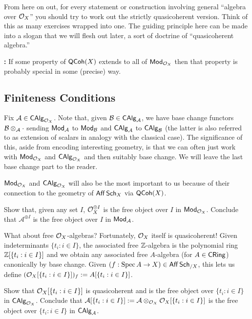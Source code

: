 \documentclass[11pt]{article}
\renewcommand{\AA}{\mathcal{A}}
\newcommand{\BB}{\mathcal{B}}
\begin{document}
From here on out, for every statement or construction involving general ``algebra over $\mathcal{O}_X$'' you should try to work out the strictly quasicoherent version. Think of this as many exercises wrapped into one. The guiding principle here can be made into a slogan that we will flesh out later, a sort of doctrine of ``quasicoherent algebra.''

\textbf{:} If some property of $\operatorname{\mathsf{QCoh}}(X)$ extends to all of $\operatorname{\mathsf{Mod}}_{\mathcal{O}_X}$ then that property is probably special in some (precise) way.

\subsection{Finiteness Conditions}
Fix $\AA\in\CAlg_{\O_X}$. Note that, given $\BB\in\CAlg_{\AA}$, we have base change functors $\BB\tensor_{\AA}\cdot$ sending $\Mod_{\AA}$ to $\Mod_{\BB}$ and $\CAlg_{\AA}$ to $\CAlg_{\BB}$ (the latter is also referred to as extension of scalars in analogy with the classical case). The significance of this, aside from encoding interesting geometry, is that we can often just work with $\operatorname{\mathsf{Mod}}_{\mathcal{O}_X}$ and $\operatorname{\mathsf{CAlg}}_{\mathcal{O}_X}$ and then suitably base change. We will leave the last base change part to the reader.

\begin{remark}
$\operatorname{\mathsf{Mod}}_{\mathcal{O}_X}$ and $\operatorname{\mathsf{CAlg}}_{\mathcal{O}_X}$ will also be the most important to us because of their connection to the geometry of $\operatorname{\mathsf{Aff}}\operatorname{\mathsf{Sch}}_X$ via $\operatorname{\mathsf{QCoh}}(X)$.
\end{remark}

\begin{exercise}
Show that, given any set $I$, $\mathcal{O}_X^{\oplus I}$ is the free object over $I$ in $\operatorname{\mathsf{Mod}}_{\mathcal{O}_X}$. Conclude that $\AA^{\oplus I}$ is the free object over $I$ in $\Mod_{\AA}$.
\end{exercise}

What about free $\mathcal{O}_X$-algebras? Fortunately, $\mathcal{O}_X$ itself is quasicoherent! Given indeterminants $\{t_i: i\in I\}$, the associated free $\mathbb{Z}$-algebra is the polynomial ring $\mathbb{Z}[\{t_i: i\in I\}]$ and we obtain any associated free $A$-algebra (for $A\in\operatorname{\mathsf{CRing}}$) canonically by base change. Given $(f: \operatorname{Spec} A\to X)\in\operatorname{\mathsf{Aff}}\operatorname{\mathsf{Sch}}_{/X}$, this lets us define $(\mathcal{O}_X[\{t_i: i\in I\}])_f:=A[\{t_i: i\in I\}]$.

\begin{exercise}
Show that $\mathcal{O}_X[\{t_i: i\in I\}]$ is quasicoherent and is the free object over $\{t_i: i\in I\}$ in $\operatorname{\mathsf{CAlg}}_{\mathcal{O}_X}$. Conclude that $\AA[\{t_i: i\in I\}]:=\AA\tensor_{\O_X}\O_X[\{t_i: i\in I\}]$ is the free object over $\{t_i: i\in I\}$ in $\CAlg_{\AA}$.
\end{exercise}
\end{document}
